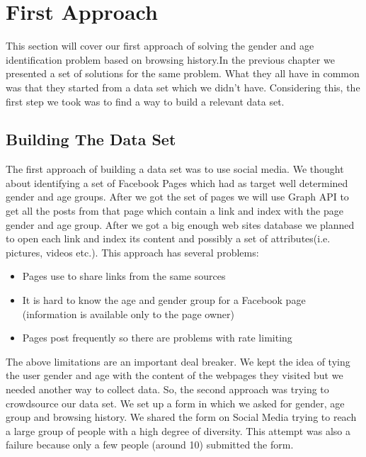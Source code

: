 \section{First Approach}

This section will cover our first approach of solving the gender and age identification problem based on browsing history.In the previous chapter we presented a set of solutions for the same problem. What they all have in common was that they started from a data set which we didn't have. Considering this, the first step we took was to find a way to build a relevant data set.

\subsection{Building The Data Set}

The first approach of building a data set was to use social media. We thought about identifying a set of Facebook Pages which had as target well determined gender and age groups. After we got the set of pages we will use Graph API to get all the posts from that page which contain a link and index with the page gender and age group. After we got a big enough web sites database we planned to open each link and index its content and possibly a set of attributes(i.e. pictures, videos etc.). This approach has several problems:
\begin{itemize}
\item Pages use to share links from the same sources
\item It is hard to know the age and gender group for a Facebook page (information is available only to the page owner)
\item Pages post frequently so there are problems with rate limiting
\end{itemize}
 
The above limitations are an important deal breaker. We kept the idea of tying the user gender and age with the content of the webpages they visited but we needed another way to collect data. So, the second approach was trying to crowdsource our data set. We set up a form in which we asked for gender, age group and browsing history. We shared the form on Social Media trying to reach a large group of people with a high degree of diversity. This attempt was also a failure because only a few people (around 10) submitted the form.

